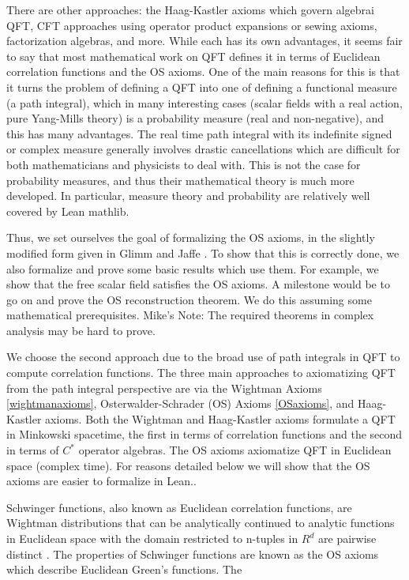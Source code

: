 \documentclass{article}
\newcommand{\1}{\mathbbm{1}}
\theoremstyle{plain}
\theoremstyle{definition}
\numberwithin{equation}{section}
\newcommand\MRD[1]{{\color{red} Mike's Note: #1}}
\begin{document}
There are other approaches: the Haag-Kastler axioms which govern algebrai QFT, CFT approaches using operator product expansions or sewing axioms,
factorization algebras, and more.  While each has its own advantages, it seems fair to say that most mathematical work on QFT defines it in terms of
Euclidean correlation functions and the OS axioms.  One of the main reasons for this is that it turns the problem of defining a QFT into one of 
defining a functional measure (a path integral), which in many interesting cases (scalar fields with a real action, pure Yang-Mills theory) is a
probability measure (real and non-negative), and this has many advantages.  The real time path integral with its
indefinite signed or complex measure generally involves drastic cancellations which are difficult for both mathematicians and physicists to deal with.
This is not the case for probability measures, and thus their mathematical theory is much more developed.  In particular, measure theory and probability are relatively well covered by Lean mathlib.

Thus, we set ourselves the goal of formalizing the OS axioms, in the slightly modified form given in Glimm and Jaffe \cite{GJ1987Axioms}.
To show that this is correctly done, we also formalize and prove some basic results which use them.
For example, we show that the free scalar field satisfies the OS axioms.  A milestone would be to go on and prove the OS reconstruction theorem.
We do this assuming some mathematical prerequisites. \MRD{The required theorems in complex analysis may be hard to prove.}


\iffalse
We choose the second approach due to the broad use of path integrals in QFT to compute correlation functions. 
The three main approaches to axiomatizing QFT from the path integral perspective are via the Wightman Axioms \ref{wightmanaxioms}, Osterwalder-Schrader (OS) Axioms \ref{OSaxioms}, and Haag-Kastler axioms. Both the Wightman and Haag-Kastler axioms formulate a QFT in Minkowski spacetime, the first in terms of correlation functions and the second in terms of $C^*$ operator algebras.
The OS axioms axiomatize QFT in Euclidean space (complex time). For reasons detailed below we will show that the OS axioms are easier to formalize in Lean.. 

Schwinger functions, also known as Euclidean correlation functions, are Wightman distributions that can be analytically continued to analytic functions in Euclidean space with the domain restricted to n-tuples in $R^d$ are pairwise distinct \cite{1 }. The properties of Schwinger functions are known as the OS axioms which describe Euclidean Green's functions. The 
\end{document}
